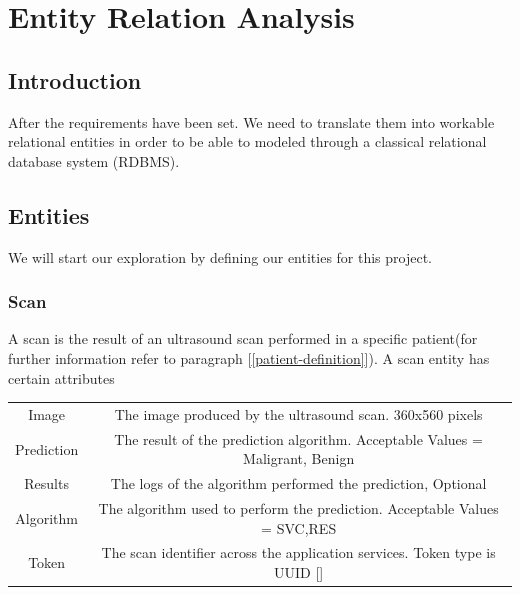 \chapter{Entity Relation Analysis}
	
	\label{entity-relation-analysis}
	\section{Introduction}
	After the requirements have been set. We need to translate them into workable relational entities in order to be able to modeled through a classical
	relational database system (RDBMS).
	\section{Entities}
	We will start our exploration by defining our entities for this project.
	\subsection{Scan}
	A scan is the result of an ultrasound scan performed in a specific patient(for further information refer to paragraph
	 [\ref{patient-definition}]). A scan entity has certain attributes
	\begin{center}
		\begin{tabular}{ |c|c| } 
			\hline
			Image & The image produced by the ultrasound scan. 360x560 pixels\\
			Prediction & The result of the prediction algorithm. Acceptable Values = {Maligrant, Benign}  \\
			Results & The logs of the algorithm performed the prediction, Optional \\
			Algorithm & The algorithm used to perform the prediction. Acceptable Values = {SVC,RES} \\
			Token& The scan identifier across the application services. Token type is UUID [\cite{rfc4122}] \\
			\hline
		\end{tabular}
	\end{center}
